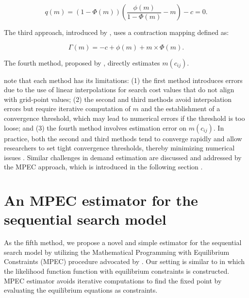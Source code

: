 \documentclass[12pt]{article}
\begin{document}
\[
    q(m) = (1-\Phi(m))\left(\frac{\phi(m)}{1-\Phi(m)} - m\right) - c = 0.
\]

The third approach, introduced by \cite{elberg2019dynamic}, uses a contraction mapping defined as:

\[
    \Gamma(m) = -c + \phi(m) + m \times \Phi(m).
\]

The fourth method, proposed by \cite{morozov2023measuring}, directly estimates \( m(c_{ij}) \).

\cite{ursu2023sequential} note that each method has its limitations: (1) the first method introduces errors due to the use of linear interpolations for search cost values that do not align with grid-point values; (2) the second and third methods avoid interpolation errors but require iterative computation of \( m \) and the establishment of a convergence threshold, which may lead to numerical errors if the threshold is too loose; and (3) the fourth method involves estimation error on \( m(c_{ij}) \). In practice, both the second and third methods tend to converge rapidly and allow researchers to set tight convergence thresholds, thereby minimizing numerical issues \citep{ursu2023sequential}. Similar challenges in demand estimation are discussed and addressed by the MPEC approach, which is introduced in the following section \citep{dube2012improving}.



\section{An MPEC estimator for the sequential search model}
As the fifth method, we propose a novel and simple estimator for the sequential search model by utilizing the Mathematical Programming with Equilibrium Constraints (MPEC) procedure advocated by \cite{su2012constrained}. 
Our setting is similar to \cite{su2012constrained} in which the likelihood function function with equilibrium constraints is constructed. 
MPEC estimator avoids iterative computations to find the fixed point by evaluating the equilibrium equations as constraints.
\end{document}
